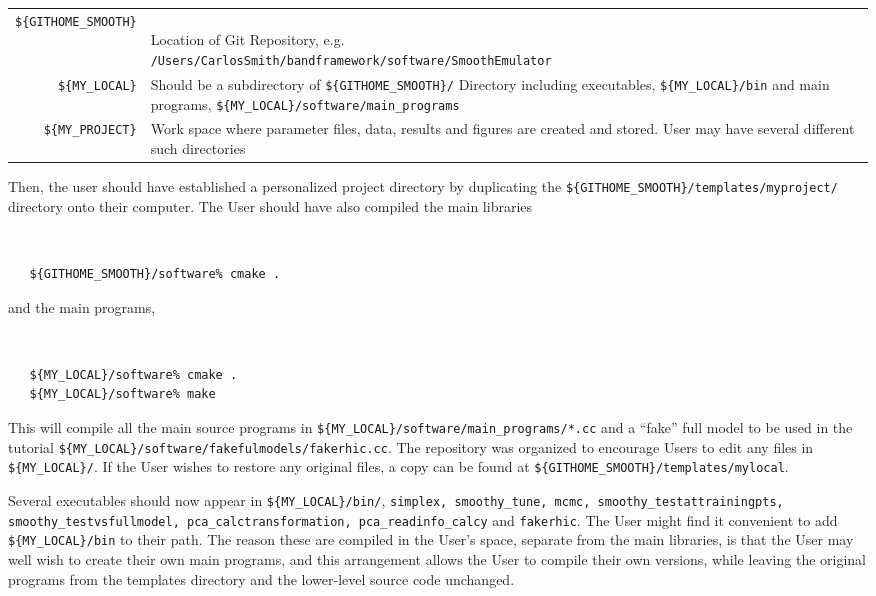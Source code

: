 \documentclass[UserManual.tex]{subfiles}
\begin{document}
\begin{tabular}{rl}\hline
{\tt \$\{GITHOME\_SMOOTH\}} & \parbox{5in}{~\\Location of Git Repository, e.g.\\{\tt /Users/CarlosSmith/bandframework/software/SmoothEmulator}\\}\\
{\tt \$\{MY\_LOCAL\}} & \parbox{5in}{Should be a subdirectory of {\tt \$\{GITHOME\_SMOOTH\}/}\\
Directory including executables, {\tt \$\{MY\_LOCAL\}/bin}\\and main programs, {\tt \$\{MY\_LOCAL\}/software/main\_programs}\\}\\
{\tt \$\{MY\_PROJECT\}} & \parbox{5in}{Work space where parameter files, data, results and figures are created and stored. User may have several different such directories}\\ \hline
\end{tabular}

Then, the user should have established a personalized project directory by duplicating the {\tt \$\{GITHOME\_SMOOTH\}/templates/myproject/} directory onto their computer. The User should have also compiled the main libraries
{\tt
\begin{verbatim}
   ${GITHOME_SMOOTH}/software% cmake .
\end{verbatim}
}
and the main programs,
{\tt
\begin{verbatim}
   ${MY_LOCAL}/software% cmake .
   ${MY_LOCAL}/software% make
\end{verbatim}
}
This will compile all the main source programs in {\tt \$\{MY\_LOCAL\}/software/main\_programs/*.cc} and a ``fake'' full model to be used in the tutorial {\tt \$\{MY\_LOCAL\}/software/fakefulmodels/fakerhic.cc}. The repository was organized to encourage Users to edit any files in {\tt \$\{MY\_LOCAL\}/}. If the User wishes to restore any original files, a copy can be found at {\tt \$\{GITHOME\_SMOOTH\}/templates/mylocal}.

Several executables should now appear in {\tt \$\{MY\_LOCAL\}/bin/}, {\tt simplex, smoothy\_tune, mcmc, smoothy\_testattrainingpts, smoothy\_testvsfullmodel, pca\_calctransformation, pca\_readinfo\_calcy} and {\tt fakerhic}. The User might find it convenient to add {\tt \$\{MY\_LOCAL\}/bin} to their path. The reason these are compiled in the User's space, separate from the main libraries, is that the User may well wish to create their own main programs, and this arrangement allows the User to compile their own versions, while leaving the original programs from the templates directory and the lower-level source code unchanged. 
\end{document}
